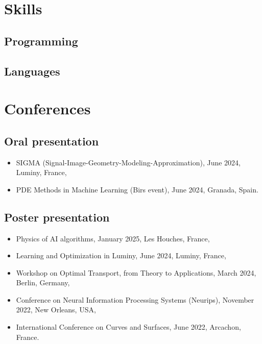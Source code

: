 \documentclass[11pt,a4paper,sans]{moderncv}
\begin{document}
\clearpage

\section{Skills}

\setlength{\columnsep}{80pt}
\begin{multicols}{2}
	
	\subsection{Programming}
	
	\vfill\null
	\columnbreak
	
	\subsection{Languages}
	
\end{multicols}

\section{Conferences}

\subsection{Oral presentation}

\begin{itemize}
	\item SIGMA (Signal-Image-Geometry-Modeling-Approximation), June 2024, Luminy, France,
	\item PDE Methods in Machine Learning (Birs event), June 2024, Granada, Spain.
\end{itemize}

\subsection{Poster presentation}

\begin{itemize}
	\item Physics of AI algorithms, January 2025, Les Houches, France,
	\item Learning and Optimization in Luminy, June 2024, Luminy, France,
	\item Workshop on  Optimal Transport, from Theory to Applications, March 2024, Berlin, Germany,
	\item Conference on Neural Information Processing Systems (Neurips), November 2022, New Orleans, USA,
	\item International Conference on Curves and Surfaces, June 2022, Arcachon, France.
\end{itemize}
\end{document}
